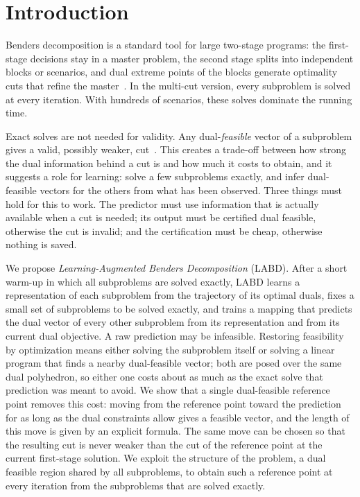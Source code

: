 \section{Introduction}\label{sec:intro}

Benders decomposition is a standard tool for large two-stage programs: the first-stage decisions stay in a master problem, the second stage splits into independent blocks or scenarios, and dual extreme points of the blocks generate optimality cuts that refine the master~\cite{geoffrion1970elements,birge2006introduction,rahmaniani2017benders}. In the multi-cut version, every subproblem is solved at every iteration. With hundreds of scenarios, these solves dominate the running time.

Exact solves are not needed for validity. Any dual-\emph{feasible} vector of a subproblem gives a valid, possibly weaker, cut~\cite{zakeri2000inexact,yang2012tighter}. This creates a trade-off between how strong the dual information behind a cut is and how much it costs to obtain, and it suggests a role for learning: solve a few subproblems exactly, and infer dual-feasible vectors for the others from what has been observed. Three things must hold for this to work. The predictor must use information that is actually available when a cut is needed; its output must be certified dual feasible, otherwise the cut is invalid; and the certification must be cheap, otherwise nothing is saved.

We propose \emph{Learning-Augmented Benders Decomposition} (LABD). After a short warm-up in which all subproblems are solved exactly, LABD learns a representation of each subproblem from the trajectory of its optimal duals, fixes a small set of subproblems to be solved exactly, and trains a mapping that predicts the dual vector of every other subproblem from its representation and from its current dual objective. A raw prediction may be infeasible. Restoring feasibility by optimization means either solving the subproblem itself or solving a linear program that finds a nearby dual-feasible vector; both are posed over the same dual polyhedron, so either one costs about as much as the exact solve that prediction was meant to avoid. We show that a single dual-feasible reference point removes this cost: moving from the reference point toward the prediction for as long as the dual constraints allow gives a feasible vector, and the length of this move is given by an explicit formula. The same move can be chosen so that the resulting cut is never weaker than the cut of the reference point at the current first-stage solution. We exploit the structure of the problem, a dual feasible region shared by all subproblems, to obtain such a reference point at every iteration from the subproblems that are solved exactly.

